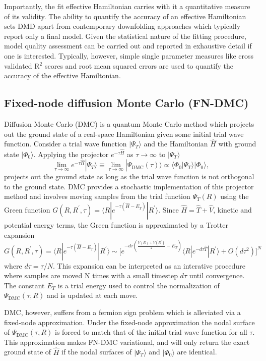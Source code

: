 \documentclass[12pt]{article}
\begin{document}
Importantly, the fit effective Hamiltonian carries with it a quantitative measure of its validity.
The ability to quantify the accuracy of an effective Hamiltonian sets DMD apart from contemporary downfolding approaches which typically report only a final model.
Given the statistical nature of the fitting procedure, model quality assessment can be carried out and reported in exhaustive detail if one is interested.
Typically, however, simple single parameter measures like cross validated R$^2$ scores and root mean squared errors are used to quantify the accuracy of the effective Hamiltonian.

\subsection{Fixed-node diffusion Monte Carlo (FN-DMC)}
Diffusion Monte Carlo (DMC) is a quantum Monte Carlo method which projects out the ground state of a real-space Hamiltonian given some initial trial wave function.
Consider a trial wave function $|\Psi_T\rangle$ and the Hamiltonian $\hat{H}$ with ground state $|\Phi_0\rangle$. 
Applying the projector $e^{-\tau \hat{H}}$ as $\tau \rightarrow \infty$ to $|\Psi_T \rangle$
\begin{equation}
\lim_{\tau \rightarrow \infty} e^{-\tau \hat{H}} |\Psi_T\rangle 
\equiv \lim_{\tau \rightarrow \infty} |\Psi_\text{DMC}(\tau)\rangle \propto \langle \Phi_0|\Psi_T\rangle |\Phi_0\rangle,
\end{equation}
projects out the ground state as long as the trial wave function is not orthogonal to the ground state. 
DMC provides a stochastic implementation of this projector method and involves moving samples from the trial function $\Psi_T(R)$ using the Green function $G(R, R^\prime, \tau) = \langle R | e^{-\tau(\hat{H} - E_T)} | R^\prime \rangle$. 
Since $\hat{H} = \hat{T} + \hat{V}$, kinetic and potential energy terms, the Green function is approximated by a Trotter expansion 
$$G(R, R^\prime, \tau) = \langle R | e^{-\tau(\hat{H} - E_T)} | R^\prime \rangle \sim \Big[e^{-d\tau(\frac{V(R) + V(R^\prime)}{2} - E_T)} \langle R| e^{-d\tau\hat{T}}|R^\prime \rangle + O(d\tau^2) \Big]^N $$ 
where $d\tau = \tau/N$.
This expansion can be interpreted as an interative procedure where samples are moved N times with a small timestep $d\tau$ until convergence.
The constant $E_T$ is a trial energy used to control the normalization of $\Psi_\text{DMC}(\tau, R)$ and is updated at each move.

DMC, however, suffers from a fermion sign problem which is alleviated via a fixed-node approximation.
Under the fixed-node approximation the nodal surface of $\Psi_\text{DMC}(\tau, R)$ is forced to match that of the initial trial wave function for all $\tau$.
This approximation makes FN-DMC variational, and will only return the exact ground state of $\hat{H}$ if the nodal surfaces of $|\Psi_T\rangle$ and $|\Phi_0\rangle$ are identical.
\end{document}
